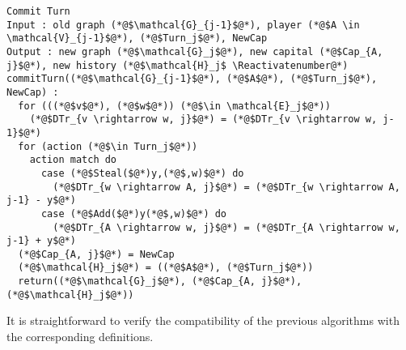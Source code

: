 \documentclass[11pt]{llncs}
\theoremstyle{definition}
\begin{document}
    \begin{lstlisting}[label=committurn, style=numbers]
Commit Turn
Input : old graph (*@$\mathcal{G}_{j-1}$@*), player (*@$A \in \mathcal{V}_{j-1}$@*), (*@$Turn_j$@*), NewCap
Output : new graph (*@$\mathcal{G}_j$@*), new capital (*@$Cap_{A, j}$@*), new history (*@$\mathcal{H}_j$ \Reactivatenumber@*)
commitTurn((*@$\mathcal{G}_{j-1}$@*), (*@$A$@*), (*@$Turn_j$@*), NewCap) :
  for (((*@$v$@*), (*@$w$@*)) (*@$\in \mathcal{E}_j$@*))
    (*@$DTr_{v \rightarrow w, j}$@*) = (*@$DTr_{v \rightarrow w, j-1}$@*)
  for (action (*@$\in Turn_j$@*))
    action match do
      case (*@$Steal($@*)y,(*@$,w)$@*) do
        (*@$DTr_{w \rightarrow A, j}$@*) = (*@$DTr_{w \rightarrow A, j-1} - y$@*)
      case (*@$Add($@*)y(*@$,w)$@*) do
        (*@$DTr_{A \rightarrow w, j}$@*) = (*@$DTr_{A \rightarrow w, j-1} + y$@*)
  (*@$Cap_{A, j}$@*) = NewCap
  (*@$\mathcal{H}_j$@*) = ((*@$A$@*), (*@$Turn_j$@*))
  return((*@$\mathcal{G}_j$@*), (*@$Cap_{A, j}$@*), (*@$\mathcal{H}_j$@*))
    \end{lstlisting}
    It is straightforward to verify the compatibility of the previous algorithms with the corresponding definitions.
\end{document}
